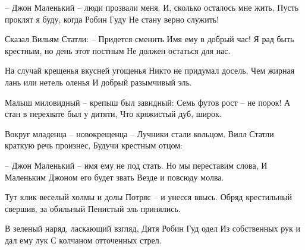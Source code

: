 \begin{flushleft}
– Джон Маленький – люди прозвали меня. \linebreak
И, сколько осталось мне жить, \linebreak
Пусть проклят я буду, когда Робин Гуду \linebreak
Не стану верно служить! \linebreak

Сказал Вильям Статли: – Придется сменить \linebreak
Имя ему в добрый час! \linebreak
Я рад быть крестным, но день этот постным \linebreak
Не должен остаться для нас. \linebreak

На случай крещенья вкусней угощенья \linebreak
Никто не придумал досель, \linebreak
Чем жирная лань или нетель оленья \linebreak
И добрый разымчивый эль. \linebreak

Малыш миловидный – крепыш был завидный: \linebreak
Семь футов рост – не порок! \linebreak
А стан в перехвате был у дитяти, \linebreak
Что кряжистый дуб, широк. \linebreak

Вокруг младенца – новокрещенца – \linebreak
Лучники стали кольцом. \linebreak
Вилл Статли краткую речь произнес, \linebreak
Будучи крестным отцом: \linebreak

– Джон Маленький – имя ему не под стать. \linebreak
Но мы переставим слова, \linebreak
И Маленьким Джоном его будет звать \linebreak
Везде и повсюду молва. \linebreak

Тут клик веселый холмы и долы \linebreak
Потряс – и унесся ввысь. \linebreak
Обряд крестильный свершив, за обильный \linebreak
Пенистый эль принялись. \linebreak

В зеленый наряд, ласкающий взгляд, \linebreak
Дитя Робин Гуд одел \linebreak
Из собственных рук и дал ему лук \linebreak
С колчаном отточенных стрел. \linebreak


\end{flushleft}
